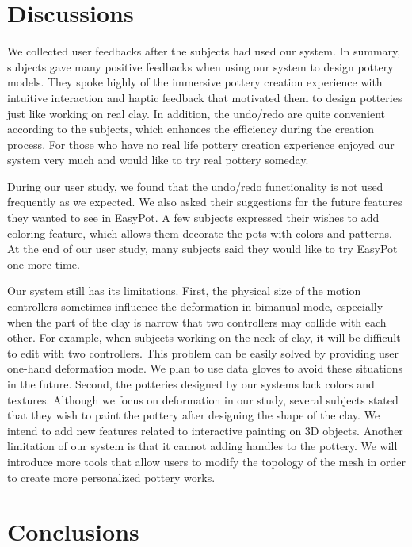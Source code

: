 \documentclass{svjour3}                     %
\begin{document}
\section{Discussions}
\label{sec:7}
We collected user feedbacks after the subjects had used our system. In summary, subjects gave many positive feedbacks when using our system to design pottery models. They spoke highly of the immersive pottery creation experience with intuitive interaction and haptic feedback that motivated them to design potteries just like working on real clay. In addition, the undo/redo are quite convenient according to the subjects, which enhances the efficiency during the creation process. For those who have no real life pottery creation experience enjoyed our system very much and would like to try real pottery someday. 

During our user study, we found that the undo/redo functionality is not used frequently as we expected. 
We also asked their suggestions for the future features they wanted to see in EasyPot.
A few subjects expressed their wishes to add coloring feature, which allows them decorate the pots with colors and patterns.
At the end of our user study, many subjects said they would like to try EasyPot one more time.

Our system still has its limitations. First, the physical size of the motion controllers sometimes influence the deformation in bimanual mode, especially when the part of the clay is narrow that two controllers may collide with each other. For example, when subjects working on the neck of clay, it will be difficult to edit with two controllers. This problem can be easily solved by providing user one-hand deformation mode. We plan to use data gloves to avoid these situations in the future.
%
Second, the potteries designed by our systems lack colors and textures. Although we focus on deformation in our study, several subjects stated that they wish to paint the pottery after designing the shape of the clay. We intend to add new features related to interactive painting on 3D objects.
%
Another limitation of our system is that it cannot adding handles to the pottery. We will introduce more tools that allow users to modify the topology of the mesh in order to create more personalized pottery works.


\section{Conclusions}
\label{sec:8}
\end{document}
